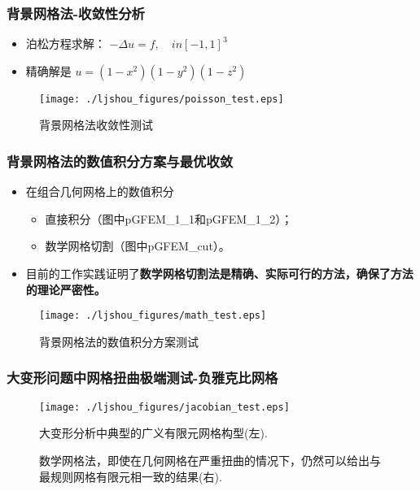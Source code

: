\documentclass[mathserif]{beamer}
\begin{document}
\begin{CJK}{UTF8}{gkai}
\begin{frame}
\frametitle{背景网格法-收敛性分析}
\begin{itemize}
	\item 泊松方程求解：
		$-\Delta u = f, \quad in [-1, 1]^3$
	\item 精确解是
		$u = (1-x^2)(1-y^2)(1-z^2)$
\end{itemize}
	\begin{figure}
	\centering
	\texttt{[image: ./ljshou\_figures/poisson\_test.eps]}
	\caption{背景网格法收敛性测试}
\end{figure}
\end{frame}

\begin{frame}
\frametitle{背景网格法的数值积分方案与最优收敛}
\begin{itemize}
	\item 在组合几何网格上的数值积分
	\begin{itemize}
		\item 直接积分（图中pGFEM\_1\_1和pGFEM\_1\_2）；
		\item 数学网格切割（图中pGFEM\_cut）。
	\end{itemize}
	\item 目前的工作实践证明了\bf{数学网格切割法}是精确、实际可行的方法，确保了方法的理论严密性。
\end{itemize}

\begin{figure}
	\centering
	\texttt{[image: ./ljshou\_figures/math\_test.eps]}
	\caption{背景网格法的数值积分方案测试}
\end{figure}
\end{frame}

\begin{frame}
\frametitle{大变形问题中网格扭曲极端测试-负雅克比网格}
\begin{figure}
	\centering
	\texttt{[image: ./ljshou\_figures/jacobian\_test.eps]}
	\caption{大变形分析中典型的广义有限元网格构型(左).}
	\caption{数学网格法，即使在几何网格在严重扭曲的情况下，仍然可以给出与最规则网格有限元相一致的结果(右). }
\end{figure}
\end{frame}



\end{CJK}
\end{document}
